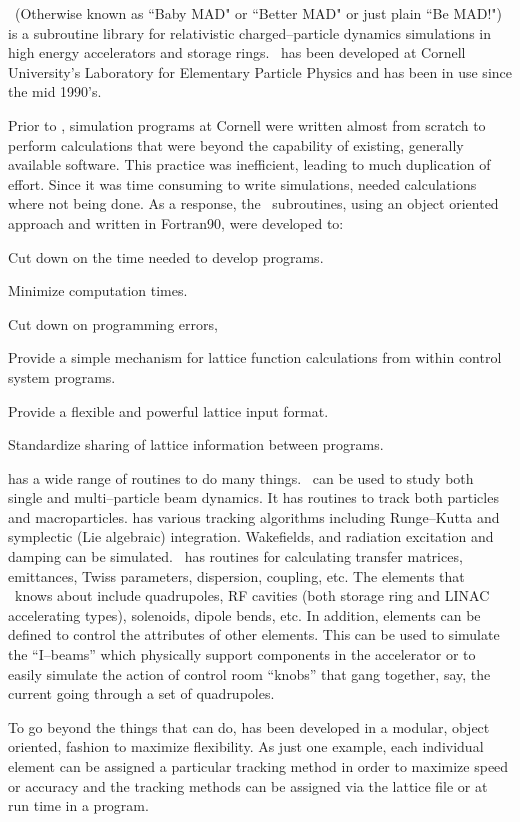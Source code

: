 
\bmad\ (Otherwise known as ``Baby MAD" or ``Better MAD" or just plain
``Be MAD!")  is a subroutine library for relativistic
charged--particle dynamics simulations in high energy accelerators and
storage rings. \bmad\ has been developed at Cornell University's
Laboratory for Elementary Particle Physics and has been in use since
the mid 1990's. 

Prior to \bmad, simulation programs at Cornell were written almost from 
scratch to perform
calculations that were beyond the capability of existing, generally
available software. This practice was inefficient, leading to much
duplication of effort.  Since it was time consuming to write
simulations, needed calculations where not being done.  As a response,
the \bmad\ subroutines, using an object oriented approach and written
in Fortran90, were developed to:
\begin{Itemize}
\item Cut down on the time needed to develop programs.
\item Minimize computation times.
\item Cut down on programming errors, 
\item Provide a simple mechanism for lattice function calculations
from within control system programs.
\item Provide a flexible and powerful lattice input format.
\item Standardize sharing of lattice information between 
programs.
\end{Itemize}

\bmad has a wide range of routines to do many things.  \bmad\ can be
used to study both single and multi--particle beam dynamics.  It has
routines to track both particles and macroparticles. \bmad has various
tracking algorithms including Runge--Kutta and symplectic (Lie
algebraic) integration.  Wakefields, and radiation excitation and
damping can be simulated. \bmad\ has routines for calculating transfer
matrices, emittances, Twiss parameters, dispersion, coupling, etc. The
elements that \bmad\ knows about include quadrupoles, RF cavities
(both storage ring and LINAC accelerating types), solenoids, dipole
bends, etc. In addition, elements can be defined to control the
attributes of other elements. This can be used to simulate the
``I--beams'' which physically support components in the accelerator
 or to easily simulate the action of control room ``knobs''
that gang together, say, the current going through a set of quadrupoles.

To go beyond the things that \bmad can do, \bmad has been developed
in a modular, object oriented, fashion to maximize flexibility. As just one 
example, each individual element can be assigned a particular tracking method
in order to maximize speed or accuracy and the tracking methods can be assigned
via the lattice file or at run time in a program.


\vfill
\break
